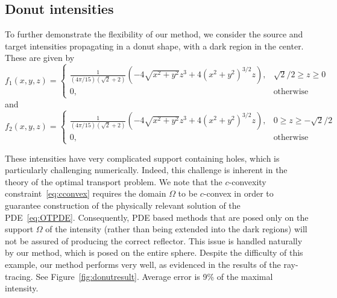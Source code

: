 \documentclass{amsart}
\theoremstyle{lemma}
\theoremstyle{remark}
\begin{document}


\subsection{Donut intensities}
To further demonstrate the flexibility of our method, we consider the source and target intensities propagating in a donut shape, with a dark region in the center.  These are given by
\begin{equation}
f_1(x,y,z) =
\begin{cases}
\frac{1}{(4\pi/15)(\sqrt{2} + 2)} \left(-4\sqrt{x^2 + y^2} z^3 + 4(x^2 + y^2)^{3/2}z \right), & \sqrt{2}/2 \geq z\geq 0 \\
0, & \text{otherwise}
\end{cases}
\end{equation}
and
\begin{equation}
f_2(x,y,z) =
\begin{cases}
\frac{1}{(4\pi/15)(\sqrt{2} + 2)} \left(-4\sqrt{x^2 + y^2} z^3 + 4(x^2 + y^2)^{3/2}z \right), & 0 \geq z \geq -\sqrt{2}/2 \\
0, & \text{otherwise}
\end{cases}
\end{equation}

These intensities have very complicated support containing holes, which is particularly challenging numerically.  Indeed, this challenge is inherent in the theory of the optimal transport problem.  We note that the $c$-convexity constraint~\eqref{eq:cconvex} requires the domain $\Omega$ to be $c$-convex in order to guarantee construction of the physically relevant solution of the PDE~\eqref{eq:OTPDE}.  Consequently, PDE based methods that are posed only on the support $\Omega$ of the intensity (rather than being extended into the dark regions) will not be assured of producing the correct reflector.  This issue is handled naturally by our method, which is posed on the entire sphere.  Despite the difficulty of this example, our method performs very well, as evidenced in the results of the ray-tracing.  See Figure~\ref{fig:donutresult}.  Average error is 9\% of the maximal intensity.
\end{document}
